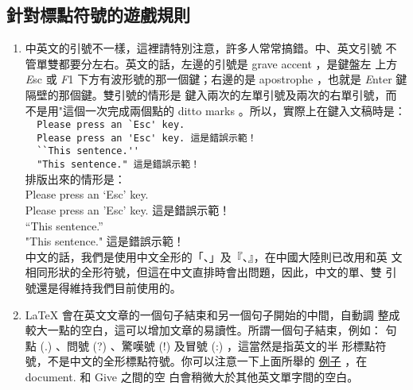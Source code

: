 \documentclass[12pt, a4paper]{report}
\begin{document}
    \subsection{針對標點符號的遊戲規則}
      \begin{enumerate}
        \item 中英文的引號不一樣，這裡請特別注意，許多人常常搞錯。中、英文引號
          不管單雙都要分左右。英文的話，左邊的引號是 grave accent ，是鍵盤左
          上方 {\emph Esc} 或 {\emph F1} 下方有波形號的那一個鍵；右邊的是 
          apostrophe ，也就是 {\emph Enter} 鍵隔壁的那個鍵。雙引號的情形是
          鍵入兩次的左單引號及兩次的右單引號，而不是用"這個一次完成兩個點的 
          ditto marks 。所以，實際上在鍵入文稿時是：\\
            \verb+  Please press an `Esc' key.+\\
            \verb+  Please press an 'Esc' key. 這是錯誤示範！+\\
            \verb+  ``This sentence.''+\\
            \verb+  "This sentence." 這是錯誤示範！+\\
          排版出來的情形是：\\
            Please press an `Esc' key.\\
            Please press an 'Esc' key. 這是錯誤示範！\\
            ``This sentence.''\\
            "This sentence." 這是錯誤示範！\\
          中文的話，我們是使用中文全形的「、」及『、』，在中國大陸則已改用和英
            文相同形狀的全形符號，但這在中文直排時會出問題，因此，中文的單、雙
            引號還是得維持我們目前使用的。
        \item LaTeX 會在英文文章的一個句子結束和另一個句子開始的中間，自動調
          整成較大一點的空白，這可以增加文章的易讀性。所謂一個句子結束，例如：
          句點 (.) 、問號 (?) 、驚嘆號 (!) 及冒號 (:) ，這當然是指英文的半
          形標點符號，不是中文的全形標點符號。你可以注意一下上面所舉的 
          \hyperlink{whitespace}{例子} ，在 document. 和 Give 之間的空
          白會稍微大於其他英文單字間的空白。


\end{enumerate}
\end{document}
